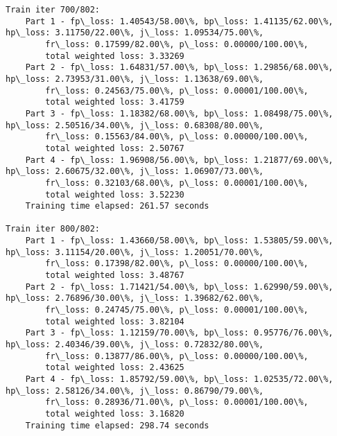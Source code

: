 \documentclass[11pt]{article}
\begin{document}
\begin{Verbatim}[commandchars=\\\{\}]
Train iter 700/802:
	Part 1 - fp\_loss: 1.40543/58.00\%, bp\_loss: 1.41135/62.00\%, hp\_loss: 3.11750/22.00\%, j\_loss: 1.09534/75.00\%, 
		fr\_loss: 0.17599/82.00\%, p\_loss: 0.00000/100.00\%, 
		total weighted loss: 3.33269
	Part 2 - fp\_loss: 1.64831/57.00\%, bp\_loss: 1.29856/68.00\%, hp\_loss: 2.73953/31.00\%, j\_loss: 1.13638/69.00\%, 
		fr\_loss: 0.24563/75.00\%, p\_loss: 0.00001/100.00\%, 
		total weighted loss: 3.41759
	Part 3 - fp\_loss: 1.18382/68.00\%, bp\_loss: 1.08498/75.00\%, hp\_loss: 2.50516/34.00\%, j\_loss: 0.68308/80.00\%, 
		fr\_loss: 0.15563/84.00\%, p\_loss: 0.00000/100.00\%, 
		total weighted loss: 2.50767
	Part 4 - fp\_loss: 1.96908/56.00\%, bp\_loss: 1.21877/69.00\%, hp\_loss: 2.60675/32.00\%, j\_loss: 1.06907/73.00\%, 
		fr\_loss: 0.32103/68.00\%, p\_loss: 0.00001/100.00\%, 
		total weighted loss: 3.52230
	Training time elapsed: 261.57 seconds

Train iter 800/802:
	Part 1 - fp\_loss: 1.43660/58.00\%, bp\_loss: 1.53805/59.00\%, hp\_loss: 3.11154/20.00\%, j\_loss: 1.20051/70.00\%, 
		fr\_loss: 0.17398/82.00\%, p\_loss: 0.00000/100.00\%, 
		total weighted loss: 3.48767
	Part 2 - fp\_loss: 1.71421/54.00\%, bp\_loss: 1.62990/59.00\%, hp\_loss: 2.76896/30.00\%, j\_loss: 1.39682/62.00\%, 
		fr\_loss: 0.24745/75.00\%, p\_loss: 0.00001/100.00\%, 
		total weighted loss: 3.82104
	Part 3 - fp\_loss: 1.12159/70.00\%, bp\_loss: 0.95776/76.00\%, hp\_loss: 2.40346/39.00\%, j\_loss: 0.72832/80.00\%, 
		fr\_loss: 0.13877/86.00\%, p\_loss: 0.00000/100.00\%, 
		total weighted loss: 2.43625
	Part 4 - fp\_loss: 1.85792/59.00\%, bp\_loss: 1.02535/72.00\%, hp\_loss: 2.58126/34.00\%, j\_loss: 0.86790/79.00\%, 
		fr\_loss: 0.28936/71.00\%, p\_loss: 0.00001/100.00\%, 
		total weighted loss: 3.16820
	Training time elapsed: 298.74 seconds


\end{Verbatim}
\end{document}
